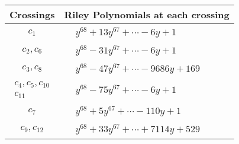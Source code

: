 \documentclass[1p]{elsarticle_modified}
\theoremstyle{definition}
\begin{document}
\begin{tabular}{m{50pt}|m{274pt}}
Crossings & \hspace{64pt}Riley Polynomials at each crossing \\
\hline $$\begin{aligned}c_{1}\end{aligned}$$&$\begin{aligned}
&y^{68}+13 y^{67}+\cdots-6 y+1
\end{aligned}$\\
\hline $$\begin{aligned}c_{2},c_{6}\end{aligned}$$&$\begin{aligned}
&y^{68}-31 y^{67}+\cdots-6 y+1
\end{aligned}$\\
\hline $$\begin{aligned}c_{3},c_{8}\end{aligned}$$&$\begin{aligned}
&y^{68}-47 y^{67}+\cdots-9686 y+169
\end{aligned}$\\
\hline $$\begin{aligned}c_{4},c_{5},c_{10}\\c_{11}\end{aligned}$$&$\begin{aligned}
&y^{68}-75 y^{67}+\cdots-6 y+1
\end{aligned}$\\
\hline $$\begin{aligned}c_{7}\end{aligned}$$&$\begin{aligned}
&y^{68}+5 y^{67}+\cdots-110 y+1
\end{aligned}$\\
\hline $$\begin{aligned}c_{9},c_{12}\end{aligned}$$&$\begin{aligned}
&y^{68}+33 y^{67}+\cdots+7114 y+529
\end{aligned}$\\
\hline
\end{tabular}
\vskip 2pc
\end{document}
